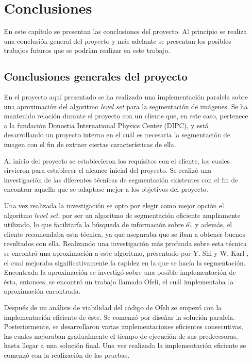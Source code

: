 \chapter{Conclusiones}

En este cap\'{i}tulo se presentan las conclusiones del proyecto. Al principio se realiza una conclusi\'{o}n general del proyecto y m\'{a}s adelante se presentan los posibles trabajos futuros que se podr\'{i}an realizar en este trabajo.

\section{Conclusiones generales del proyecto}

En el proyecto aqu\'{i} presentado se ha realizado una implementaci\'{o}n paralela sobre una aproximaci\'{o}n del algoritmo \textit{level set} para la segmentaci\'{o}n de im\'{a}genes. Se ha mantenido relaci\'{o}n durante el proyecto con un cliente que, en este caso, pertenece a la fundaci\'{o}n Donostia International Physics Center (DIPC), y est\'{a} desarrollando un proyecto interno en el cu\'{a}l es necesaria la segmentaci\'{o}n de imagen con el fin de extraer ciertas caracter\'{i}sticas de ella. 

Al inicio del proyecto se establecieron los requisitos con el cliente, los cuales sirvieron para establecer el alcance inicial del proyecto. Se realiz\'{o} una investigaci\'{o}n de las diferentes t\'{e}cnicas de segmentaci\'{o}n existentes con el fin de encontrar aquella que se adaptase mejor a los objetivos del proyecto. 

Una vez realizada la investigaci\'{o}n se opto por elegir como mejor opci\'{o}n el algoritmo \textit{level set}, por ser un algoritmo de segmentaci\'{o}n eficiente ampliamente utilizado, lo que facilitar\'{i}a la b\'{u}squeda de informaci\'{o}n sobre \'{e}l, y adem\'{a}s, el cliente recomendaba esta t\'{e}cnica, ya que aseguraba que se iban a obtener buenos resultados con ella. Realizando una investigaci\'{o}n m\'{a}s profunda sobre esta t\'{e}cnica se encontr\'{o} una aproximaci\'{o}n a este algoritmo, presentado por Y. Shi y W. Karl \cite{yong1}, el cual mejoraba significativamente la rapidez en la que se hac\'{i}a la segmentaci\'{o}n. Encontrada la aproximaci\'{o}n se investig\'{o} sobre una posible implementaci\'{o}n de \'{e}sta, entonces, se encontr\'{o} un trabajo llamado Ofeli, el cu\'{a}l implementaba la aproximaci\'{o}n encontrada.

Despu\'{e}s de un an\'{a}lisis de viabilidad del c\'{o}digo de Ofeli se empez\'{o} con la implementaci\'{o}n eficiente de \'{e}ste. Se comenz\'{o} por dise\~{n}ar la soluci\'{o}n paralela. Posteriormente, se desarrollaron varias implementaciones eficientes consecutivas, las cuales mejoraban gradualmente el tiempo de ejecuci\'{o}n de sus predecesoras, hasta llegar a una soluci\'{o}n final. Una vez realizada la implementaci\'{o}n eficiente se comenz\'{o} con la realizaci\'{o}n de las pruebas.

